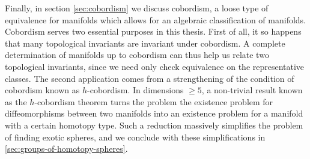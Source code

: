 Finally, in section \cref{sec:cobordism} we discuss cobordism, a loose type of equivalence for manifolds which allows for an algebraic classification of manifolds. Cobordism serves two essential purposes in this thesis. 
First of all, it so happens that many topological invariants are invariant under cobordism. A complete determination of manifolds up to cobordism can thus help us relate two topological invariants, since we need only check equivalence on the representative classes. The second application comes from a strengthening of the condition of cobordism known as $h$-cobordism. 
In dimensions $\geq 5$, a non-trivial result known as the $h$-cobordism theorem turns the problem the existence problem for diffeomorphisms between two manifolds into an existence problem for a manifold with a certain homotopy type.
Such a reduction massively simplifies the problem of finding exotic spheres, and we conclude with these simplifications in \cref{sec:groups-of-homotopy-spheres}.






